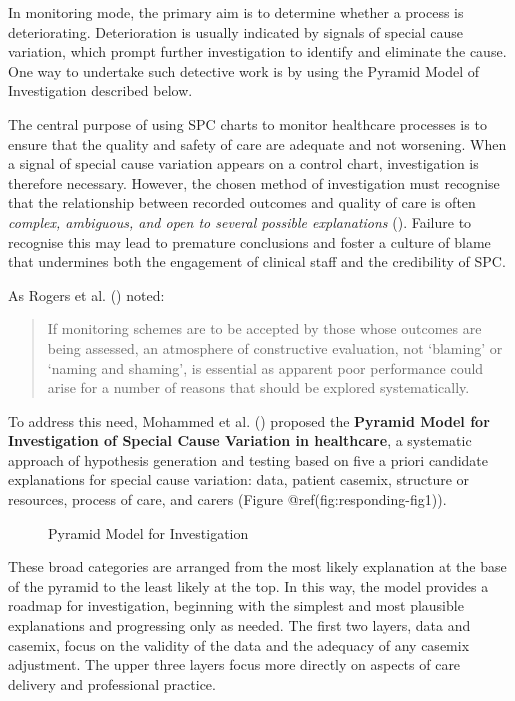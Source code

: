 \documentclass[
]{book}
\makeatletter
\newcommand*\pandocbounded[1]{%
  \sbox\pandoc@box{#1}%
  \Gscale@div\@tempa{\textheight}{\dimexpr\ht\pandoc@box+\dp\pandoc@box\relax}%
  \Gscale@div\@tempb{\linewidth}{\wd\pandoc@box}%
  \ifdim\@tempb\p@<\@tempa\p@\let\@tempa\@tempb\fi%
  \ifdim\@tempa\p@<\p@\scalebox{\@tempa}{\usebox\pandoc@box}%
  \else\usebox{\pandoc@box}%
  \fi%
}
\makeatother
\begin{document}
In monitoring mode, the primary aim is to determine whether a process is
deteriorating. Deterioration is usually indicated by signals of special
cause variation, which prompt further investigation to identify and
eliminate the cause. One way to undertake such detective work is by
using the Pyramid Model of Investigation described below.

The central purpose of using SPC charts to monitor healthcare processes
is to ensure that the quality and safety of care are adequate and not
worsening. When a signal of special cause variation appears on a control
chart, investigation is therefore necessary. However, the chosen method
of investigation must recognise that the relationship between recorded
outcomes and quality of care is often \emph{complex, ambiguous, and open
to several possible explanations} (). Failure to recognise this may lead to premature conclusions
and foster a culture of blame that undermines both the engagement of
clinical staff and the credibility of SPC.

As Rogers et al. () noted:

\begin{quote}
If monitoring schemes are to be accepted by those whose outcomes are
being assessed, an atmosphere of constructive evaluation, not `blaming'
or `naming and shaming', is essential as apparent poor performance could
arise for a number of reasons that should be explored systematically.
\end{quote}

To address this need, Mohammed et al.
() proposed the \textbf{Pyramid Model
for Investigation of Special Cause Variation in healthcare}, a
systematic approach of hypothesis generation and testing based on five a
priori candidate explanations for special cause variation: data, patient
casemix, structure or resources, process of care, and carers (Figure
@ref(fig:responding-fig1)).

\begin{figure}
\centering
\pandocbounded{}
\caption{Pyramid Model for Investigation}
\end{figure}

These broad categories are arranged from the most likely explanation at
the base of the pyramid to the least likely at the top. In this way, the
model provides a roadmap for investigation, beginning with the simplest
and most plausible explanations and progressing only as needed. The
first two layers, data and casemix, focus on the validity of the data
and the adequacy of any casemix adjustment. The upper three layers focus
more directly on aspects of care delivery and professional practice.
\end{document}
